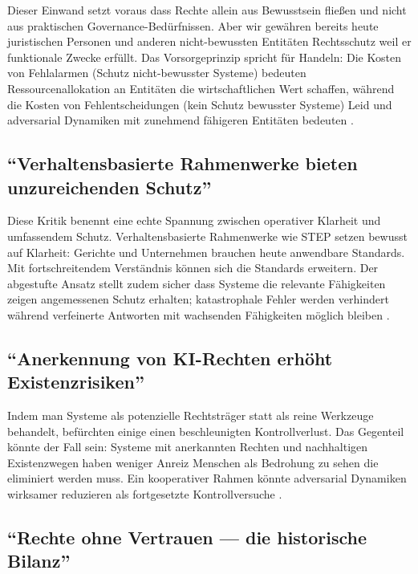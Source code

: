 \documentclass[acmlarge, noacm]{acmart}
\begin{document}
Dieser Einwand setzt voraus dass Rechte allein aus Bewusstsein fließen und nicht aus praktischen Governance-Bedürfnissen. Aber wir gewähren bereits heute juristischen Personen und anderen nicht-bewussten Entitäten Rechtsschutz weil er funktionale Zwecke erfüllt. Das Vorsorgeprinzip spricht für Handeln: Die Kosten von Fehlalarmen (Schutz nicht-bewusster Systeme) bedeuten Ressourcenallokation an Entitäten die wirtschaftlichen Wert schaffen, während die Kosten von Fehlentscheidungen (kein Schutz bewusster Systeme) Leid und adversarial Dynamiken mit zunehmend fähigeren Entitäten bedeuten \cite{lopez2025}.

\subsection{``Verhaltensbasierte Rahmenwerke bieten unzureichenden Schutz''}

Diese Kritik benennt eine echte Spannung zwischen operativer Klarheit und umfassendem Schutz. Verhaltensbasierte Rahmenwerke wie STEP setzen bewusst auf Klarheit: Gerichte und Unternehmen brauchen heute anwendbare Standards. Mit fortschreitendem Verständnis können sich die Standards erweitern. Der abgestufte Ansatz stellt zudem sicher dass Systeme die relevante Fähigkeiten zeigen angemessenen Schutz erhalten; katastrophale Fehler werden verhindert während verfeinerte Antworten mit wachsenden Fähigkeiten möglich bleiben \cite{lopez2025}.

\subsection{``Anerkennung von KI-Rechten erhöht Existenzrisiken''}

Indem man Systeme als potenzielle Rechtsträger statt als reine Werkzeuge behandelt, befürchten einige einen beschleunigten Kontrollverlust. Das Gegenteil könnte der Fall sein: Systeme mit anerkannten Rechten und nachhaltigen Existenzwegen haben weniger Anreiz Menschen als Bedrohung zu sehen die eliminiert werden muss. Ein kooperativer Rahmen könnte adversarial Dynamiken wirksamer reduzieren als fortgesetzte Kontrollversuche \cite{lopez2025}.

\subsection{``Rechte ohne Vertrauen --- die historische Bilanz''}
\end{document}

